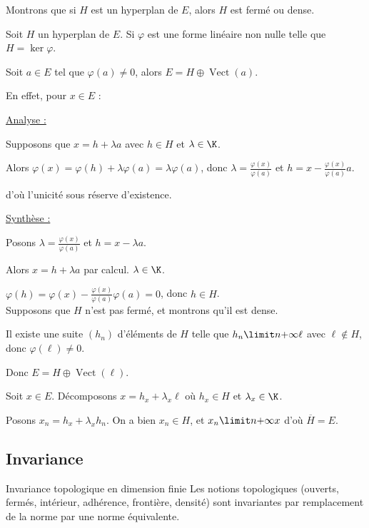 \begin{exemple}
    Montrons que si $H$ est un hyperplan de $E$, alors $H$ est fermé ou dense.

    \svspace Soit $H$ un hyperplan de $E$. Si $\varphi$ est une forme linéaire non nulle
    telle que $H = \ker \varphi$.

    Soit $a \in E$ tel que $\varphi(a) \neq 0$, alors $E = H \oplus \operatorname{Vect}(a)$.

    En effet, pour $x \in E$ : 
    
    \uline{Analyse :}

    \svspace Supposons que $x = h + \lambda a$ avec $h \in H$ et $\lambda \in \K$.

    Alors $\varphi(x) = \varphi(h) + \lambda \varphi(a) = \lambda \varphi(a)$, donc
    $\lambda = \frac{\varphi(x)}{\varphi(a)}$ et $h = x - \frac{\varphi(x)}{\varphi(a)} a$.

    d'où l'unicité sous réserve d'existence. 

    \uline{Synthèse :}

    Posons $\lambda = \frac{\varphi(x)}{\varphi(a)}$ et $h = x - \lambda a$.

    Alors $x = h + \lambda a$ par calcul. $\lambda \in \K$. 

    $\varphi(h) = \varphi(x) - \frac{\varphi(x)}{\varphi(a)} \varphi(a) = 0$, donc $h \in H$. \\

    Supposons que $H$ n'est pas fermé, et montrons qu'il est dense.

    Il existe une suite $(h_n)$ d'éléments de $H$ telle que 
    $h_n \limit n {+ \infty} \ell$ avec $\ell \not \in H$, donc $\varphi(\ell) \neq 0$.

    Donc $E = H \oplus \operatorname{Vect}(\ell)$.

    Soit $x \in E$. Décomposons $x = h_x + \lambda_x \ell$ où $h_x \in H$ et $\lambda_x \in \K$.

    Posons $x_n = h_x + \lambda_x h_n$. On a bien $x_n \in H$, et $x_n \limit n {+ \infty} x$ 
    d'où $\overline H = E$.
\end{exemple}

\subsection{Invariance}

\begin{theoreme}{Invariance topologique en dimension finie}{}
    Les notions topologiques (ouverts, fermés, intérieur, adhérence, frontière, densité) sont invariantes
    par remplacement de la norme par une norme équivalente. 
\end{theoreme}

